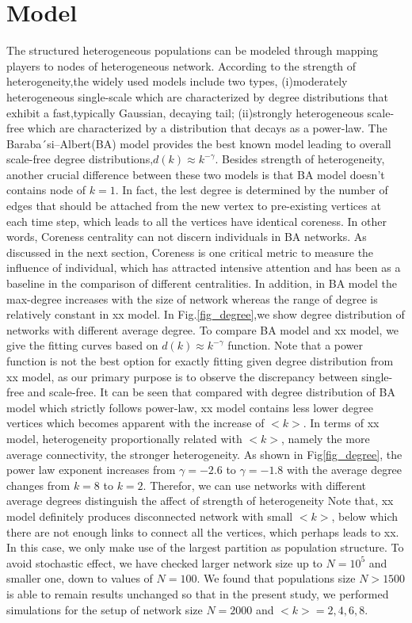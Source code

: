 \documentclass[preprint,12pt,3p]{elsarticle}
\begin{document}
\section{Model}

\label{network model}
The structured heterogeneous populations can be modeled through mapping players to
nodes of heterogeneous network.
According to the strength of heterogeneity,the widely used models include two types,
(i)moderately heterogeneous single-scale which are characterized by degree distributions that exhibit a fast,typically Gaussian, decaying tail\cite{AmaralScala-18327};
(ii)strongly heterogeneous scale-free which are characterized by a distribution that decays as a power-law. The Baraba´si–Albert(BA) model provides the best known model leading to overall scale-free degree distributions,$d(k)\approx k^{-\gamma}$.
Besides strength of heterogeneity, another crucial difference between these two models is that BA model
doesn't contains node of $k=1$. In fact, the lest degree is determined by the number of edges that should be attached from the new vertex to pre-existing vertices at each time step, which leads to all the vertices have identical coreness. In other words, Coreness centrality can not discern individuals in BA networks. As discussed in the next section, Coreness is one critical metric to measure the influence of individual, which has attracted intensive attention and has been as a baseline in the comparison of different centralities.
In addition, in BA model the max-degree increases with the size of network whereas the range of degree is relatively constant in xx model.
In Fig.\ref{fig_degree},we show degree distribution of networks with different average degree. To compare BA model and xx model, we give the fitting curves based on $d(k)\approx k^{-\gamma}$ function. Note that a power function is not the best option for exactly fitting given degree distribution from xx model, as our primary purpose is to observe the discrepancy between single-free and scale-free.
It can be seen that compared with degree distribution of BA model which strictly follows power-law, xx model contains less lower degree vertices which becomes apparent with the increase of $<k>$.
In terms of xx model, heterogeneity proportionally related with $<k>$, namely the more average connectivity, the stronger heterogeneity. As shown in Fig\ref{fig_degree}, the power law exponent increases from  $\gamma=-2.6$ to $\gamma=-1.8$ with the average degree changes from $k=8$ to $k=2$.
Therefor, we can use networks with different average degrees distinguish the affect of strength of heterogeneity
Note that, xx model definitely produces disconnected network with small $<k>$, below which there are not
enough links to connect all the vertices, which perhaps leads to xx.
In this case, we only make use of the largest partition as population structure.
To avoid stochastic effect, we have checked larger network size up to $N=10^5$ and smaller one,
down to values of $N=100$.
We found that populations size $N>1500$ is able to remain results unchanged so that in the present study,
we performed simulations for the setup of network size $N=2000$ and $<k>=2,4,6,8$.
\end{document}
